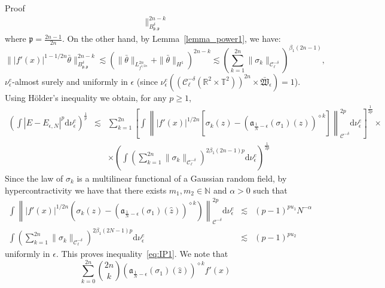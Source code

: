 \documentclass[a4paper,10pt]{article}
\newcommand{\mathd}{\mathrm{d}}
\newenvironment{proof*}[1]{\noindent\textbf{#1\ }}{\hspace*{\fill}$\Box$\medskip}
\begin{document}
\begin{proof*}{Proof}
\begin{eqnarray}
    \|_{B^{\delta}_{\mathfrak{p, \mathfrak{p}}}}^{2 n - k} \nonumber
  \end{eqnarray}
  where $\mathfrak{p} = \frac{2 n - 1}{2 n}$. On the other hand, by
  Lemma~\ref{lemma_power1}, we have:
  \[ \| | f' (x) |^{1 - 1 / 2 n} \bar{\theta} \|_{B^{\delta}_{\mathfrak{p,
     \mathfrak{p}}}}^{2 n - k} \lesssim \left( \| \bar{\theta} \|_{L^{2
     n}_{f^{1 / 2 n}}} + \| \bar{\theta} \|_{H^1} \right)^{2 n - k} \lesssim
     \left( \sum_{k = 1}^{2 n} \| \sigma_k \|_{\mathcal{C}^{- \delta}_{\ell}}
     \right)^{\beta_1 (2 n - 1)}, \]
  $\nu^e_{\epsilon}$-almost surely and uniformly in $\epsilon$ (since
  $\nu^e_{\epsilon} ((\mathcal{C}^{- \delta}_{\ell} (\mathbb{R}^2 \times
  \mathbb{T}^2))^{2 n} \times \mathfrak{\bar{W}}_{\epsilon}) = 1$). Using
  H{\"o}lder's inequality we obtain, for any $p \geq 1$,
  \begin{eqnarray}
    \left( \int | E - E_{\epsilon, N} |^p \mathd \nu_{\epsilon}^e
    \right)^{\frac{1}{p}} & \lesssim & \sum_{k = 1}^{2 n} \left[ \int \left\|
    | f' (x) |^{1 / 2 n} \left[ \sigma_k (z) - \left(
    \mathfrak{a}_{\frac{1}{N} - \epsilon} (\sigma_1) (\hat{z})
    \right)^{\diamond k} \right] \right\|_{\mathcal{C}^{- \delta}}^{2 p}
    \mathd \nu^e_{\epsilon} \right]^{\frac{1}{2 p}} \times \nonumber\\
    &  & \times \left( \int \left( \sum_{k = 1}^{2 n} \| \sigma_k
    \|_{\mathcal{C}^{- \delta}_{\ell}} \right)^{2 \beta_1 (2 n - 1) p} \mathd
    \nu_{\epsilon}^e \right)^{\frac{1}{2 p}} \nonumber
  \end{eqnarray}
  Since the law of $\sigma_k$ is a multilinear functional of a Gaussian random
  field, by hypercontractivity we have that there exists $m_1, m_2 \in
  \mathbb{N}$ and $\alpha > 0$ such that
  \begin{eqnarray}
    \int \left\| | f' (x) |^{1 / 2 n} \left( \sigma_k (z) - \left(
    \mathfrak{a}_{\frac{1}{N} - \epsilon} (\sigma_1) (\hat{z})
    \right)^{\diamond k} \right) \right\|_{\mathcal{C}^{- \delta}}^{2 p}
    \mathd \nu^e_{\epsilon} & \lesssim & (p - 1)^{p u_1} N^{- \alpha}
    \nonumber\\
    \int \left( \sum_{k = 1}^{2 n} \| \sigma_k \|_{\mathcal{C}^{-
    \delta}_{\ell}} \right)^{2 \beta_1 (2 N - 1) p} \mathd \nu_{\epsilon}^e &
    \lesssim & (p - 1)^{p u_2} \nonumber
  \end{eqnarray}
  uniformly in $\epsilon$. This proves inequality~{\eqref{eq:IP1}}. We note
  that
  \[ \sum_{k = 0}^{2 n} \binom{2 n}{k} \left( \mathfrak{a}_{\frac{1}{N} -
     \epsilon} (\sigma_1) (\hat{z}) \right)^{\diamond k} f' (x) 
\]
\end{proof*}
\end{document}
